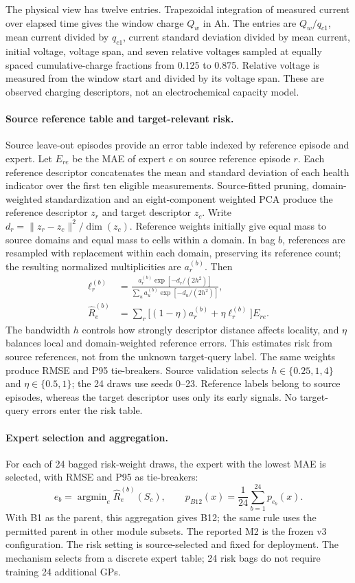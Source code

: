 \documentclass[preprint,12pt]{elsarticle}
\begin{document}
The physical view has twelve entries. Trapezoidal integration of measured current over elapsed time gives the window charge $Q_w$ in Ah. The entries are $Q_w/q_{c1}$, mean current divided by $q_{c1}$, current standard deviation divided by mean current, initial voltage, voltage span, and seven relative voltages sampled at equally spaced cumulative-charge fractions from 0.125 to 0.875. Relative voltage is measured from the window start and divided by its voltage span. These are observed charging descriptors, not an electrochemical capacity model.

\paragraph{Source reference table and target-relevant risk.}
Source leave-out episodes provide an error table indexed by reference episode and expert. Let $E_{re}$ be the MAE of expert $e$ on source reference episode $r$. Each reference descriptor concatenates the mean and standard deviation of each health indicator over the first ten eligible measurements. Source-fitted pruning, domain-weighted standardization and an eight-component weighted PCA produce the reference descriptor $z_r$ and target descriptor $z_c$. Write $d_r=\|z_r-z_c\|^2/\dim(z_c)$. Reference weights initially give equal mass to source domains and equal mass to cells within a domain. In bag $b$, references are resampled with replacement within each domain, preserving its reference count; the resulting normalized multiplicities are $a_r^{(b)}$. Then
\begin{align}
\ell_r^{(b)}&=\frac{a_r^{(b)}\exp[-d_r/(2h^2)]}{\sum_u a_u^{(b)}\exp[-d_u/(2h^2)]},\\
\widehat R_e^{(b)}&=\sum_r\big[(1-\eta)a_r^{(b)}+\eta\ell_r^{(b)}\big]E_{re}.
\end{align}
The bandwidth $h$ controls how strongly descriptor distance affects locality, and $\eta$ balances local and domain-weighted reference errors. This estimates risk from source references, not from the unknown target-query label. The same weights produce RMSE and P95 tie-breakers. Source validation selects $h\in\{0.25,1,4\}$ and $\eta\in\{0.5,1\}$; the 24 draws use seeds 0--23. Reference labels belong to source episodes, whereas the target descriptor uses only its early signals. No target-query errors enter the risk table.

\paragraph{Expert selection and aggregation.}
For each of 24 bagged risk-weight draws, the expert with the lowest MAE is selected, with RMSE and P95 as tie-breakers:
\begin{equation}
e_b=\mathop{\arg\min}_{e}\widehat R_e^{(b)}(S_c),\qquad
p_{B12}(x)=\frac{1}{24}\sum_{b=1}^{24}p_{e_b}(x).
\end{equation}
With B1 as the parent, this aggregation gives B12; the same rule uses the permitted parent in other module subsets. The reported M2 is the frozen v3 configuration. The risk setting is source-selected and fixed for deployment. The mechanism selects from a discrete expert table; 24 risk bags do not require training 24 additional GPs.
\end{document}
